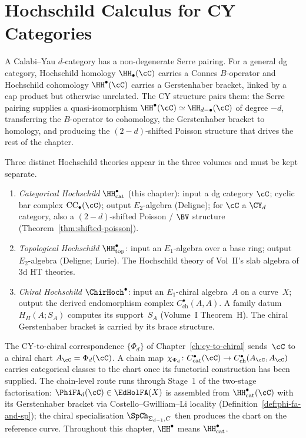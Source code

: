 \chapter{Hochschild Calculus for CY Categories}
\label{ch:hochschild-calculus}

A Calabi--Yau $d$-category has a non-degenerate Serre pairing. For a
general dg category, Hochschild homology $\HH_\bullet(\cC)$ carries a
Connes $B$-operator and Hochschild cohomology $\HH^\bullet(\cC)$
carries a Gerstenhaber bracket, linked by a cap product but otherwise
unrelated. The CY structure pairs them: the Serre pairing supplies a
quasi-isomorphism $\HH^\bullet(\cC) \simeq \HH_{d - \bullet}(\cC)$ of
degree $-d$, transferring the $B$-operator to cohomology, the
Gerstenhaber bracket to homology, and producing the
$(2-d)$-shifted Poisson structure that drives the rest of the chapter.

\begin{remark}
\label{rem:hochschild-convention-categorical}
Three distinct Hochschild theories appear in the three volumes and must be kept separate.
\begin{enumerate}
 \item \emph{Categorical Hochschild} $\HH^\bullet_{\mathrm{cat}}$ (this chapter): input a dg category $\cC$; cyclic bar complex $\mathrm{CC}_\bullet(\cC)$; output $E_2$-algebra (Deligne); for $\cC$ a $\CY_d$ category, also a $(2{-}d)$-shifted Poisson / $\BV$ structure (Theorem~\textup{\ref{thm:shifted-poisson}}).
 \item \emph{Topological Hochschild} $\HH^\bullet_{\mathrm{top}}$: input an $E_1$-algebra over a base ring; output $E_2$-algebra (Deligne; Lurie). The Hochschild theory of Vol~II's slab algebra of 3d HT theories.
 \item \emph{Chiral Hochschild} $\ChirHoch^\bullet$: input an
 $E_1$-chiral algebra~$A$ on a curve~$X$; output the derived
 endomorphism complex $C^\bullet_{\mathrm{ch}}(A,A)$.  A family datum
 $H_H(A;S_A)$ computes its support~$S_A$ (Volume~I Theorem~H).  The
 chiral Gerstenhaber bracket is carried by its brace structure.
\end{enumerate}
The CY-to-chiral correspondence $\{\Phi_d\}$ of
Chapter~\ref{ch:cy-to-chiral} sends~$\cC$ to a chiral chart
$A_\cC=\Phi_d(\cC)$.  A chain map
$\chi_{\Phi_d}\colon C^\bullet_{\mathrm{cat}}(\cC)\to
C^\bullet_{\mathrm{ch}}(A_\cC,A_\cC)$ carries categorical classes to
the chart once its functorial construction has been supplied.  The
chain-level route runs through Stage~1 of the two-stage factorisation:
$\PhiFA_d(\cC) \in \EdHolFA(X)$ is assembled from
$\HH^\bullet_{\mathrm{cat}}(\cC)$ with its Gerstenhaber bracket via
Costello--Gwilliam--Li locality
(Definition~\ref{def:phi-fa-and-sp}); the chiral specialisation
$\SpCh_{\Sigma_{d-1},C}$ then produces the chart on the reference
curve.  Throughout this chapter, $\HH^\bullet$ means
$\HH^\bullet_{\mathrm{cat}}$.
\end{remark}

